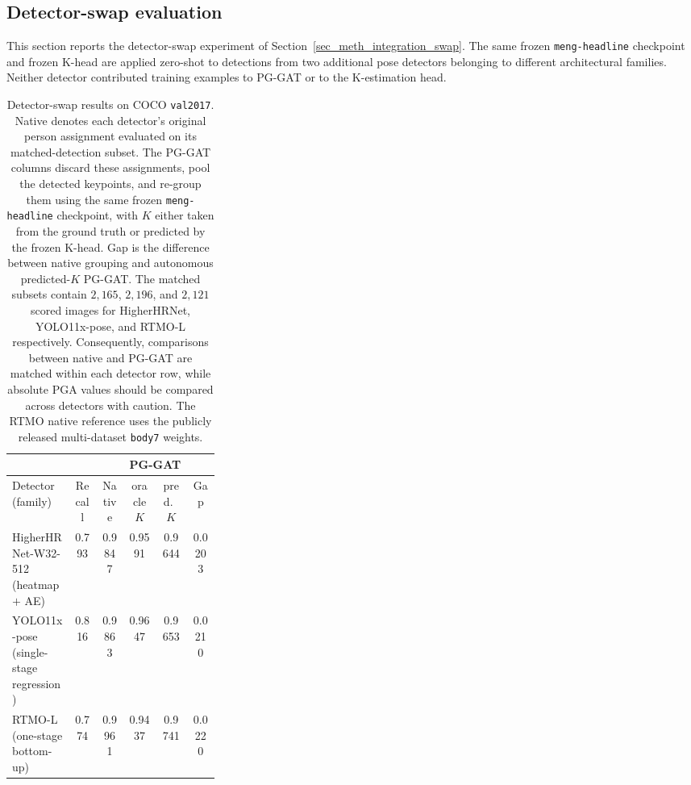\subsection{Detector-swap evaluation}
\label{sec_res_e2e_swap}

This section reports the detector-swap experiment of
Section~\ref{sec_meth_integration_swap}.
The same frozen \texttt{meng-headline} checkpoint and frozen K-head
are applied zero-shot to detections from two additional pose detectors
belonging to different architectural families.
Neither detector contributed training examples to PG-GAT
or to the K-estimation head.

\begin{table}[H]
\centering
\caption[Detector-swap results on COCO \texttt{val2017}.]{Detector-swap results on COCO \texttt{val2017}. Native
denotes each detector's original person assignment evaluated on its
matched-detection subset. The PG-GAT columns discard these assignments,
pool the detected keypoints,
and re-group them using the same frozen \texttt{meng-headline} checkpoint,
with $K$ either taken from the ground truth or predicted by the frozen
K-head. Gap is the difference between native grouping and autonomous
predicted-$K$ PG-GAT. The matched subsets contain $2{,}165$,
$2{,}196$, and $2{,}121$ scored images for HigherHRNet,
YOLO11x-pose, and RTMO-L respectively.
Consequently, comparisons between native and PG-GAT are matched within
each detector row, while absolute PGA values should be compared across
detectors with caution. The RTMO native reference uses the publicly
released multi-dataset \texttt{body7} weights.}
\label{tab:e2e_detector_swap}
\tablesize
\begin{tabular}{>{\raggedright\arraybackslash}p{0.30\linewidth}ccccc}
\toprule
 & & & \multicolumn{2}{c}{PG-GAT} & \\
\cmidrule(lr){4-5}
Detector (family) & Recall & Native & oracle $K$ & pred.\ $K$ & Gap \\
\midrule
HigherHRNet-W32-512 \newline (heatmap $+$ AE)
    & 0.793 & 0.9847 & 0.9591 & 0.9644 & 0.0203 \\
YOLO11x-pose \newline (single-stage regression)
    & 0.816 & 0.9863 & 0.9647 & 0.9653 & 0.0210 \\
RTMO-L \newline (one-stage bottom-up)
    & 0.774 & 0.9961 & 0.9437 & 0.9741 & 0.0220 \\
\bottomrule
\end{tabular}
\end{table}

